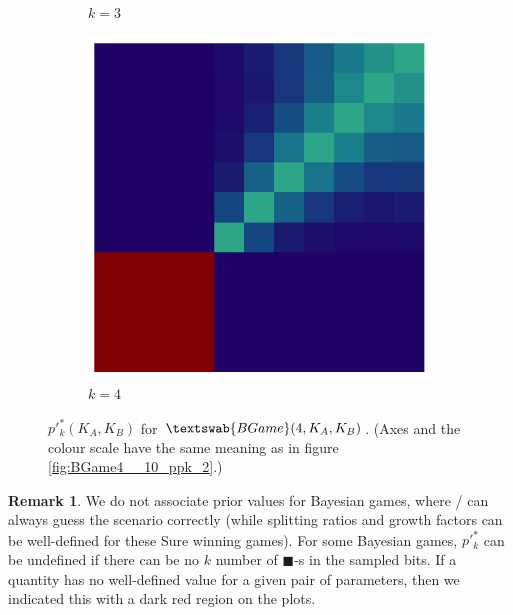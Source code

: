 \documentclass{article}
\newcommand{\bb}{\blacksquare}
\theoremstyle{definition}
\newtheorem*{remark}{Remark}
\newcommand{\BG}[1]{$\textswab{BGame}(#1)$}
\begin{document}
\begin{figure}[H]
\begin{subfigure}[b]{0.185\textwidth}
        \caption{$k=3$}
        \label{fig:ppkBG_4_3}
    \end{subfigure}
    \hspace{0.00\textwidth} %
        \begin{subfigure}[b]{0.185\textwidth}
        \includegraphics[width=\textwidth]{img/ppkB_Plot_4_4_10.pdf}
        \caption{$k=4$}
        \label{fig:ppkBG_4_4}
    \end{subfigure}

    \caption{$p'^*_k(K_A,K_B)$ for \BG{4,K_A,K_B}.
    (Axes and the colour scale have the same meaning as in figure \ref{fig:BGame4__10_ppk_2}.)
    }
    \label{fig:ppk_InfBG_4_01234}
\end{figure}

\begin{remark}
    We do not associate prior values for Bayesian games, where \PI/ can always guess the scenario correctly (while splitting ratios and growth factors can be well-defined for these Sure winning games).
    For some Bayesian games, $p'^*_k$ can be undefined if there can be no $k$ number of $\bb$-s in the sampled bits. If a quantity has no well-defined value for a given pair of parameters, then we indicated this with a dark red region on the plots.

\end{remark}
\end{document}
